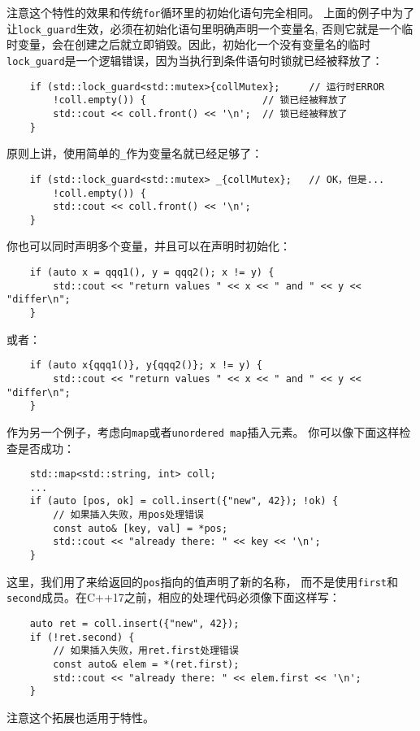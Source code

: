注意这个特性的效果和传统\texttt{for}循环里的初始化语句完全相同。
上面的例子中为了让\texttt{lock\_guard}生效，必须在初始化语句里明确声明一个变量名,
否则它就是一个临时变量，会在创建之后就立即销毁。因此，初始化一个没有变量名的临时
\texttt{lock\_guard}是一个逻辑错误，因为当执行到条件语句时锁就已经被释放了：
\begin{lstlisting}
    if (std::lock_guard<std::mutex>{collMutex};     // 运行时ERROR
        !coll.empty()) {                    // 锁已经被释放了
        std::cout << coll.front() << '\n';  // 锁已经被释放了
    }
\end{lstlisting}
原则上讲，使用简单的\texttt{\_}作为变量名就已经足够了：
\begin{lstlisting}
    if (std::lock_guard<std::mutex> _{collMutex};   // OK，但是...
        !coll.empty()) {
        std::cout << coll.front() << '\n';
    }
\end{lstlisting}
你也可以同时声明多个变量，并且可以在声明时初始化：
\begin{lstlisting}
    if (auto x = qqq1(), y = qqq2(); x != y) {
        std::cout << "return values " << x << " and " << y << "differ\n";
    }
\end{lstlisting}
或者：
\begin{lstlisting}
    if (auto x{qqq1()}, y{qqq2()}; x != y) {
        std::cout << "return values " << x << " and " << y << "differ\n";
    }
\end{lstlisting}
作为另一个例子，考虑向\texttt{map}或者\texttt{unordered map}插入元素。
你可以像下面这样检查是否成功：
\begin{lstlisting}
    std::map<std::string, int> coll;
    ...
    if (auto [pos, ok] = coll.insert({"new", 42}); !ok) {
        // 如果插入失败，用pos处理错误
        const auto& [key, val] = *pos;
        std::cout << "already there: " << key << '\n';
    }
\end{lstlisting}
这里，我们用了来给返回的\texttt{pos}指向的值声明了新的名称，
而不是使用\texttt{first}和\texttt{second}成员。在C++17之前，相应的处理代码必须像下面这样写：
\begin{lstlisting}
    auto ret = coll.insert({"new", 42});
    if (!ret.second) {
        // 如果插入失败，用ret.first处理错误
        const auto& elem = *(ret.first);
        std::cout << "already there: " << elem.first << '\n';
    }
\end{lstlisting}
注意这个拓展也适用于特性。

